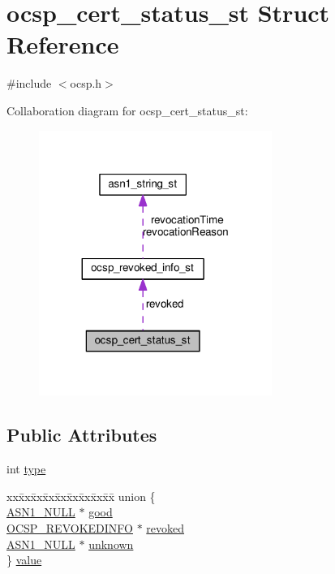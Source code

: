 \hypertarget{structocsp__cert__status__st}{}\section{ocsp\+\_\+cert\+\_\+status\+\_\+st Struct Reference}
\label{structocsp__cert__status__st}


{\ttfamily \#include $<$ocsp.\+h$>$}



Collaboration diagram for ocsp\+\_\+cert\+\_\+status\+\_\+st\+:
\nopagebreak
\begin{figure}[H]
\begin{center}
\leavevmode
\includegraphics[width=215pt]{structocsp__cert__status__st__coll__graph}
\end{center}
\end{figure}
\subsection*{Public Attributes}
\begin{DoxyCompactItemize}
\item 
int \hyperlink{structocsp__cert__status__st_a8e834ed8fedd7e6709723625989a2dcf}{type}
\item 
\begin{tabbing}
xx\=xx\=xx\=xx\=xx\=xx\=xx\=xx\=xx\=\kill
union \{\\
\>\hyperlink{ossl__typ_8h_af03954fbfeac7d608f362307da7c57eb}{ASN1\_NULL} $\ast$ \hyperlink{structocsp__cert__status__st_a96f64d7018fc012a59e5cbb4d315b16a}{good}\\
\>\hyperlink{ocsp_8h_acff3cf1e134c62bfeb8e073b9a496c3b}{OCSP\_REVOKEDINFO} $\ast$ \hyperlink{structocsp__cert__status__st_a323bb45ae7def2ac2d8ad8541d7c12bd}{revoked}\\
\>\hyperlink{ossl__typ_8h_af03954fbfeac7d608f362307da7c57eb}{ASN1\_NULL} $\ast$ \hyperlink{structocsp__cert__status__st_a092195c83ed96b20960ecb39fb04bbe8}{unknown}\\
\} \hyperlink{structocsp__cert__status__st_a6d4c1250dc9b5223323e54da986baf60}{value}\\

\end{tabbing}\end{DoxyCompactItemize}


